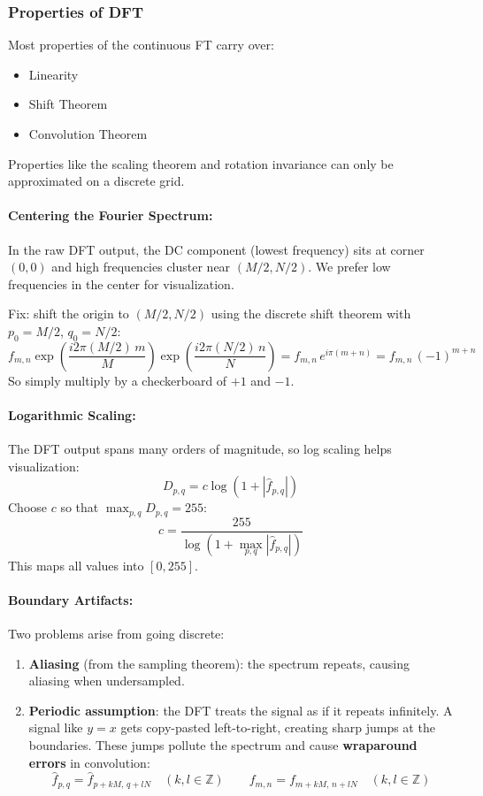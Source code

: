 \documentclass{article}
\begin{document}
\subsubsection{Properties of DFT}
Most properties of the continuous FT carry over:
\begin{itemize}
  \item Linearity
  \item Shift Theorem
  \item Convolution Theorem
\end{itemize}
Properties like the scaling theorem and rotation invariance can only be
approximated on a discrete grid.

\paragraph{Centering the Fourier Spectrum:}
In the raw DFT output, the DC component (lowest frequency) sits at corner $(0,0)$
and high frequencies cluster near $(M/2, N/2)$. We prefer low frequencies in the
center for visualization.

Fix: shift the origin to $(M/2, N/2)$ using the discrete shift theorem with
$p_0 = M/2$, $q_0 = N/2$:
\[
  f_{m,n}
  \exp\!\left(\frac{i2\pi (M/2)\,m}{M}\right)
  \exp\!\left(\frac{i2\pi (N/2)\,n}{N}\right)
  = f_{m,n}\,e^{i\pi(m+n)}
  = f_{m,n}\,(-1)^{m+n}
\]
So simply multiply by a checkerboard of $+1$ and $-1$.

\paragraph{Logarithmic Scaling:}
The DFT output spans many orders of magnitude, so log scaling helps visualization:
\[
  D_{p,q} = c\log\!\left(1 + |\hat{f}_{p,q}|\right)
\]
Choose $c$ so that $\max_{p,q} D_{p,q} = 255$:
\[
  c = \frac{255}{\log\!\left(1 + \max_{p,q}|\hat{f}_{p,q}|\right)}
\]
This maps all values into $[0, 255]$.

\paragraph{Boundary Artifacts:}
Two problems arise from going discrete:
\begin{enumerate}
  \item \textbf{Aliasing} (from the sampling theorem): the spectrum repeats,
        causing aliasing when undersampled.
  \item \textbf{Periodic assumption}: the DFT treats the signal as if it repeats
        infinitely. A signal like $y = x$ gets copy-pasted left-to-right, creating
        sharp jumps at the boundaries. These jumps pollute the spectrum and cause
        \textbf{wraparound errors} in convolution:
        \[
          \hat{f}_{p,q} = \hat{f}_{p+kM,\,q+lN} \quad (k,l \in \mathbb{Z})
          \qquad
          f_{m,n} = f_{m+kM,\,n+lN} \quad (k,l \in \mathbb{Z})
        \]
\end{enumerate}
\end{document}
